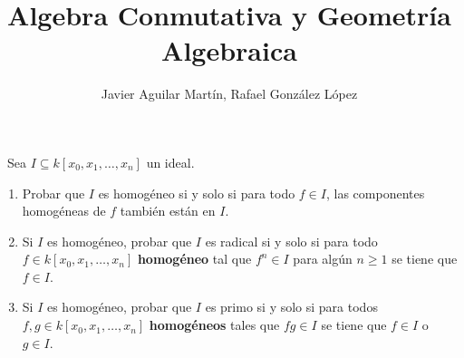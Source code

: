 \documentclass[twoside]{article}
\begin{document}
\title{Algebra Conmutativa y Geometría Algebraica}
\author{Javier Aguilar Martín, Rafael González López}
\maketitle

\begin{ejercicio}{1}\
Sea $I \subseteq k[x_0, x_1,\dots, x_n]$ un ideal.
\begin{enumerate}
\item Probar que $I$ es homogéneo si y solo si para todo $f \in I$, las
componentes
homogéneas de $f$ también están en $I$.
\item  Si $I$ es homogéneo, probar que $I$ es radical si y solo si para todo $f \in k[x_0, x_1,\dots, x_n]$
\textbf{homogéneo} tal que $f^n \in I$ para algún $n \geq 1$ se tiene que $f \in I$.
\item Si $I$ es homogéneo, probar que $I$ es primo si y solo si para todos $f, g \in
k[x_0, x_1,\dots, x_n]$ \textbf{homogéneos} tales que $fg \in I$ se tiene que $f \in I$ o $g \in I$.
\end{enumerate}
\end{ejercicio}
\end{document}
